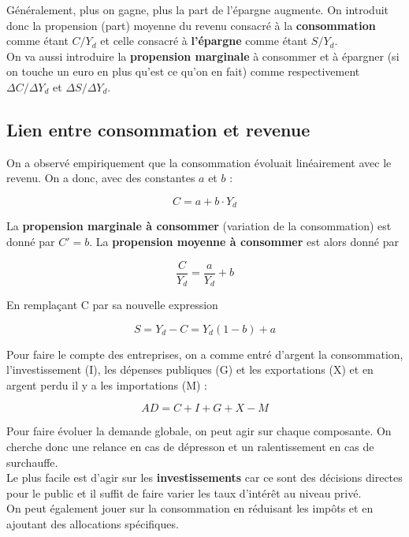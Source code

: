 Généralement, plus on gagne, plus la part de l'épargne augmente. On introduit donc la propension (part) moyenne du revenu consacré à la \textbf{consommation} comme étant $C/Y_d$ et celle consacré à \textbf{l'épargne} comme étant $S/Y_d$. \\
On va aussi introduire la \textbf{propension marginale} à consommer et à épargner (si on touche un euro en plus qu'est ce qu'on en fait) comme respectivement $\Delta C/\Delta Y_d$ et $\Delta S/\Delta Y_d$.

\subsection{Lien entre consommation et revenue}
On a observé empiriquement que la consommation évoluait linéairement avec le revenu. On a donc, avec des constantes $a$ et $b$ :

\begin{equation}
	C = a + b \cdot Y_d 
\end{equation}

La \textbf{propension marginale à consommer} (variation de la consommation) est donné par $C' = b$. La \textbf{propension moyenne à consommer} est alors donné par 

\begin{equation}
	\frac{C}{Y_d} = \frac{a}{Y_d} + b
\end{equation}

En remplaçant C par sa nouvelle expression

\begin{equation}
	S = Y_d - C = Y_d(1-b) + a
\end{equation}

Pour faire le compte des entreprises, on a comme entré d'argent la consommation, l'investissement (I), les dépenses publiques (G) et les exportations (X) et en argent perdu il y a les importations (M) : 

\begin{equation}
	AD = C + I + G + X - M
\end{equation}

Pour faire évoluer la demande globale, on peut agir sur chaque composante. On cherche donc une relance en cas de dépresson et un ralentissement en cas de surchauffe. \\
Le plus facile est d'agir sur les \textbf{investissements} car ce sont des décisions directes pour le public et il suffit de faire varier les taux d'intérêt au niveau privé. \\
On peut également jouer sur la consommation en réduisant les impôts et en ajoutant des allocations spécifiques. 


